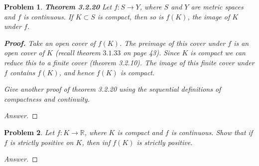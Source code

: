 \documentclass{article}
\newtheorem{problem}{Problem}[section]
\begin{document}
\begin{problem}
   \textbf{Theorem 3.2.20}
    Let $f: S \rightarrow Y$, where $S$ and $Y$ are metric spaces and $f$ is continuous. If $K \subset S$ is compact, then so is $f(K)$, the image of $K$ under $f$.
    
    \textbf{Proof.} Take an open cover of $f(K)$. The preimage of this cover under $f$ is an open cover of $K$ (recall theorem $3.1 .33$ on page 43). Since $K$ is compact we can reduce this to a finite cover (theorem 3.2.10). The image of this finite cover under $f$ contains $f(K)$, and hence $f(K)$ is compact.

    Give another proof of theorem 3.2.20 using the sequential definitions
of compactness and continuity.

\end{problem}
\begin{proof}[Answer]
    
\end{proof}


\begin{problem}Let $f: K \rightarrow \mathbb{R}$, where $K$ is compact and $f$ is continuous. Show that if $f$ is strictly positive on $K$, then inf $f(K)$ is strictly positive.

\end{problem}
\begin{proof}[Answer]
    
\end{proof}
\end{document}
